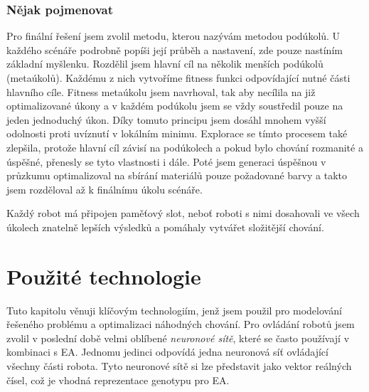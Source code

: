 \subsubsection*{Nějak pojmenovat}
Pro finální řešení jsem zvolil metodu, kterou nazývám metodou podúkolů. U každého scénáře podrobně popíši její průběh a nastavení, zde pouze nastíním základní  myšlenku. Rozdělil jsem hlavní cíl na několik menších podúkolů (metaúkolů). Každému z nich vytvoříme fitness funkci odpovídající nutné části hlavního cíle. Fitness metaúkolu jsem navrhoval, tak aby necílila na již optimalizované úkony a v každém podúkolu jsem se vždy soustředil pouze na jeden jednoduchý úkon. Díky tomuto principu jsem dosáhl mnohem vyšší odolnosti proti uvíznutí v lokálním minimu. Explorace se tímto procesem také zlepšila, protože hlavní cíl závisí na podúkolech a pokud bylo chování rozmanité a úspěšné, přenesly se tyto vlastnosti i dále. Poté jsem generaci úspěšnou v průzkumu optimalizoval na sbírání materiálů pouze požadované barvy a takto jsem rozděloval až k finálnímu úkolu scénáře. 
\par 
Každý robot má připojen paměťový slot, neboť roboti s nimi dosahovali ve všech úkolech znatelně lepších výsledků a pomáhaly vytvářet složitější chování. 
\section{Použité technologie}
Tuto kapitolu věnuji klíčovým technologiím, jenž jsem použil pro modelování řešeného problému a optimalizaci náhodných chování. Pro ovládání robotů jsem zvolil v poslední době velmi oblíbené \textit{neuronové sítě}, které se často používají v kombinaci s EA. Jednomu jedinci odpovídá jedna neuronová síť ovládající všechny části robota. Tyto neuronové sítě si lze představit jako vektor reálných čísel, což je vhodná reprezentace genotypu pro EA. 
